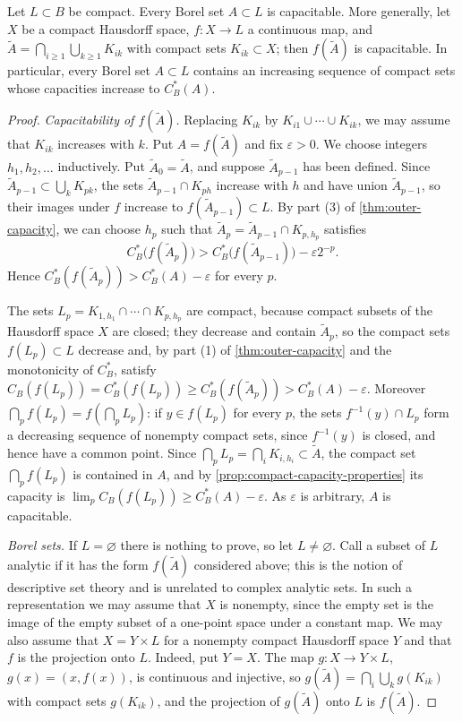 \begin{theorem}\label{thm:choquet-capacitability}
Let $L\subset B$ be compact. Every Borel set $A\subset L$ is capacitable. More generally, let $X$ be a compact Hausdorff space, $f\colon X\to L$ a continuous map, and $\widetilde A=\bigcap_{i\geq1}\bigcup_{k\geq1}K_{ik}$ with compact sets $K_{ik}\subset X$; then $f(\widetilde A)$ is capacitable. In particular, every Borel set $A\subset L$ contains an increasing sequence of compact sets whose capacities increase to $C_B^*(A)$.
\end{theorem}
\begin{proof}
\emph{Capacitability of $f(\widetilde A)$.} Replacing $K_{ik}$ by $K_{i1}\cup\cdots\cup K_{ik}$, we may assume that $K_{ik}$ increases with $k$. Put $A=f(\widetilde A)$ and fix $\varepsilon>0$. We choose integers $h_1,h_2,\ldots$ inductively. Put $\widetilde A_0=\widetilde A$, and suppose $\widetilde A_{p-1}$ has been defined. Since $\widetilde A_{p-1}\subset\bigcup_kK_{pk}$, the sets $\widetilde A_{p-1}\cap K_{ph}$ increase with $h$ and have union $\widetilde A_{p-1}$, so their images under $f$ increase to $f(\widetilde A_{p-1})\subset L$. By part (3) of \cref{thm:outer-capacity}, we can choose $h_p$ such that $\widetilde A_p=\widetilde A_{p-1}\cap K_{p,h_p}$ satisfies
\[
 C_B^*\bigl(f(\widetilde A_p)\bigr)>C_B^*\bigl(f(\widetilde A_{p-1})\bigr)-\varepsilon2^{-p}.
\]
Hence $C_B^*(f(\widetilde A_p))>C_B^*(A)-\varepsilon$ for every $p$.

The sets $L_p=K_{1,h_1}\cap\cdots\cap K_{p,h_p}$ are compact, because compact subsets of the Hausdorff space $X$ are closed; they decrease and contain $\widetilde A_p$, so the compact sets $f(L_p)\subset L$ decrease and, by part (1) of \cref{thm:outer-capacity} and the monotonicity of $C_B^*$, satisfy $C_B(f(L_p))=C_B^*(f(L_p))\geq C_B^*(f(\widetilde A_p))>C_B^*(A)-\varepsilon$. Moreover $\bigcap_pf(L_p)=f(\bigcap_pL_p)$: if $y\in f(L_p)$ for every $p$, the sets $f^{-1}(y)\cap L_p$ form a decreasing sequence of nonempty compact sets, since $f^{-1}(y)$ is closed, and hence have a common point. Since $\bigcap_pL_p=\bigcap_iK_{i,h_i}\subset\widetilde A$, the compact set $\bigcap_pf(L_p)$ is contained in $A$, and by \cref{prop:compact-capacity-properties} its capacity is $\lim_pC_B(f(L_p))\geq C_B^*(A)-\varepsilon$. As $\varepsilon$ is arbitrary, $A$ is capacitable.

\emph{Borel sets.} If $L=\varnothing$ there is nothing to prove, so let $L\neq\varnothing$. Call a subset of $L$ analytic if it has the form $f(\widetilde A)$ considered above; this is the notion of descriptive set theory and is unrelated to complex analytic sets. In such a representation we may assume that $X$ is nonempty, since the empty set is the image of the empty subset of a one-point space under a constant map. We may also assume that $X=Y\times L$ for a nonempty compact Hausdorff space $Y$ and that $f$ is the projection onto $L$. Indeed, put $Y=X$. The map $g\colon X\to Y\times L$, $g(x)=(x,f(x))$, is continuous and injective, so $g(\widetilde A)=\bigcap_i\bigcup_kg(K_{ik})$ with compact sets $g(K_{ik})$, and the projection of $g(\widetilde A)$ onto $L$ is $f(\widetilde A)$.


\end{proof}

